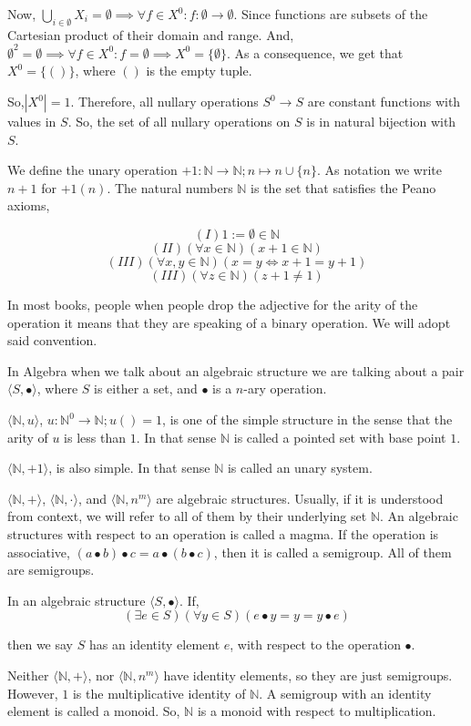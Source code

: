 \documentclass{article}
\newcommand\N{\mathbb{N}}
\begin{document}
  Now, $\bigcup_{i\in \emptyset} X_i =
  \emptyset \implies \forall f\in X^0: f:\emptyset \rightarrow
  \emptyset$. Since functions are subsets of the Cartesian product of
  their domain and range. And, $\emptyset^2 = \emptyset \implies \forall
  f \in X^0: f = \emptyset \implies X^0 = \{\emptyset\}$. As a consequence, we get that $X^0 =
  \{()\}$, where $()$ is the empty tuple.

So,$|X^0| = 1$. Therefore, all nullary
operations $S^0\rightarrow S$ are constant functions with values in
$S$. So, the set of all nullary operations on $S$ is in natural
bijection with $S$.

We define the unary operation $+ 1: \N\rightarrow \N; n \mapsto n\cup
\{n\}$. As notation we write $n + 1$ for $+ 1(n)$. The natural numbers $\N$ is the set that satisfies the Peano axioms,

\[(I) 1 := \emptyset \in \N\]
\[(II)(\forall x \in \N)(x + 1\in \N) \]
\[(III)(\forall x,y \in \N)(x = y \iff x + 1 = y + 1)\]
\[(III)(\forall z \in \N)(z + 1 \neq 1)\]

In most books, people when people drop the adjective for the arity of
the operation it means that they are speaking of a binary
operation. We will adopt said convention.

In Algebra when we talk about an algebraic structure we are talking
about a pair $\langle S,\bullet\rangle$, where $S$ is either a set,
and $\bullet$ is a $n$-ary operation.

$\langle \N, u \rangle$, $u:\N^0\rightarrow \N; u() = 1$, is one of
the simple structure in the sense that the arity of $u$ is less than $1$. In
that sense $\N$ is called a pointed set with base point $1$.

$\langle \N, + 1 \rangle$, is also simple. In
that sense $\N$ is called an unary system.

$\langle \N, + \rangle$, $\langle \N,\cdot \rangle$, and $\langle
\N, n^m \rangle$ are algebraic structures. Usually, if it is understood
from context, we will refer to all of them by their underlying set
$\N$. An algebraic structures with respect
to an operation is called a magma. If the operation is associative,
$(a\bullet b)\bullet c = a \bullet (b\bullet c)$, then it is called a
semigroup. All of them are semigroups.

In an algebraic structure $\langle S,\bullet \rangle$. If,
\[(\exists e \in S)(\forall y \in S)(e\bullet y = y = y\bullet e)\]

then we say $S$ has an identity element $e$, with respect to the
operation $\bullet$.

Neither $\langle \N,+ \rangle$, nor $\langle \N, n^m \rangle$ have
identity elements, so they are just semigroups. However, $1$ is the
multiplicative identity of $\N$. A semigroup with an identity element
is called a monoid. So, $\N$ is a monoid with respect to
multiplication.
\end{document}
